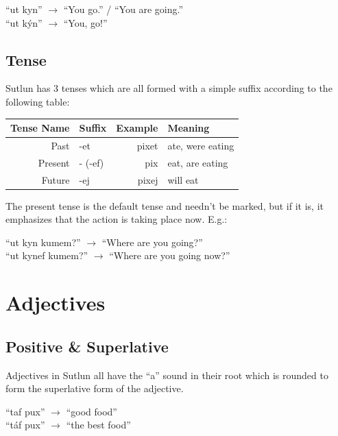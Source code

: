 \documentclass{book}
\begin{document}
\begin{center}
    ``ut kyn'' $\rightarrow$ ``You go.'' / ``You are going.'' \\
    ``ut kýn'' $\rightarrow$ ``You, go!''
\end{center}

\subsection{Tense}
Sutlun has 3 tenses which are all formed with a simple suffix according to the following table:

\begin{center}
    \begin{tabular}{|r|l|r|l|}
        \hline
        Tense Name  & Suffix    & Example   & Meaning \\
        \hline
        Past        & -et       & pixet     & ate, were eating \\
        Present     & - (-ef)   & pix       & eat, are eating \\
        Future      & -ej       & pixej     & will eat \\
        \hline
    \end{tabular}
\end{center}
The present tense is the default tense and needn't be marked, but if it is, it emphasizes that
the action is taking place now. E.g.:

\begin{center}
    ``ut kyn kumem?'' $\rightarrow$ ``Where are you going?'' \\
    ``ut kynef kumem?'' $\rightarrow$ ``Where are you going now?''
\end{center}


\section{Adjectives}
\subsection{Positive \& Superlative}
Adjectives in Sutlun all have the ``a'' sound in their root which is rounded to form the superlative
form of the adjective.

\begin{center}
    ``taf pux'' $\rightarrow$ ``good food'' \\
    ``táf pux'' $\rightarrow$ ``the best food''
\end{center}
\end{document}
